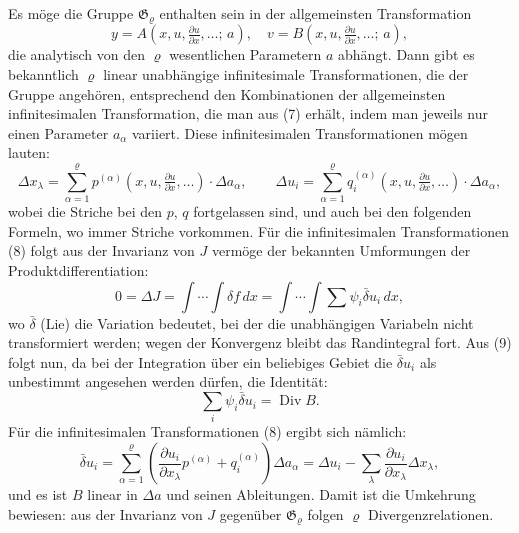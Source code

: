 \documentclass[12pt,a4paper]{article}
\begin{document}
Es m\"oge die Gruppe $\mathfrak{G}_{\varrho}$ enthalten sein in der allgemeinsten Transformation
\begin{equation}\tag{7}
y=A(x,u,\tfrac{\partial u}{\partial x},\ldots;\,a),\quad v=B(x,u,\tfrac{\partial u}{\partial x},\ldots;\,a),
\end{equation}
die analytisch von den $\varrho$ wesentlichen Parametern $a$ abh\"angt. Dann gibt es bekanntlich $\varrho$ linear unabh\"angige infinitesimale Transformationen, die der Gruppe angeh\"oren, entsprechend den Kombinationen der allgemeinsten infinitesimalen Transformation, die man aus (7) erh\"alt, indem man jeweils nur einen Parameter $a_{\alpha}$ variiert. Diese infinitesimalen Transformationen m\"ogen lauten:
\begin{equation}\tag{8}
\Delta x_{\lambda}=\sum_{\alpha=1}^{\varrho}p^{(\alpha)}(x,u,\tfrac{\partial u}{\partial x},\ldots)\cdot\Delta a_{\alpha},\qquad
\Delta u_{i}=\sum_{\alpha=1}^{\varrho}q_{i}^{(\alpha)}(x,u,\tfrac{\partial u}{\partial x},\ldots)\cdot\Delta a_{\alpha},
\end{equation}
wobei die Striche bei den $p$, $q$ fortgelassen sind, und auch bei den folgenden Formeln, wo immer Striche vorkommen. F\"ur die infinitesimalen Transformationen (8) folgt aus der Invarianz von $J$ verm\"oge der bekannten Umformungen der Produktdifferentiation:
\begin{equation}\tag{9}
0=\Delta J=\int\cdots\int\delta f\,dx=\int\cdots\int\sum\psi_{i}\bar{\delta}u_{i}\,dx,
\end{equation}
wo $\bar{\delta}$ (Lie) die Variation bedeutet, bei der die unabh\"angigen Variabeln nicht transformiert werden; wegen der Konvergenz bleibt das Randintegral fort. Aus (9) folgt nun, da bei der Integration \"uber ein beliebiges Gebiet die $\bar{\delta}u_{i}$ als unbestimmt angesehen werden d\"urfen, die Identit\"at:
\begin{equation}\tag{10}
\sum_{i}\psi_{i}\bar{\delta}u_{i}=\operatorname{Div}B.
\end{equation}
F\"ur die infinitesimalen Transformationen (8) ergibt sich n\"amlich:
\begin{equation}\tag{11}
\bar{\delta}u_{i}=\sum_{\alpha=1}^{\varrho}\left(\frac{\partial u_{i}}{\partial x_{\lambda}}p^{(\alpha)}+q_{i}^{(\alpha)}\right)\Delta a_{\alpha}=\Delta u_{i}-\sum_{\lambda}\frac{\partial u_{i}}{\partial x_{\lambda}}\Delta x_{\lambda},
\end{equation}
und es ist $B$ linear in $\Delta a$ und seinen Ableitungen. Damit ist die Umkehrung bewiesen: aus der Invarianz von $J$ gegen\"uber $\mathfrak{G}_{\varrho}$ folgen $\varrho$ Divergenzrelationen.
\end{document}
